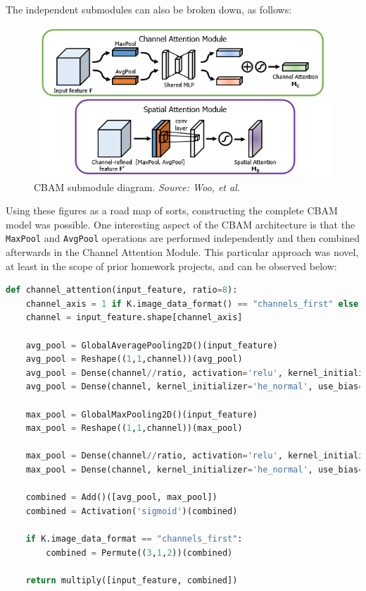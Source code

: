 \documentclass{article}
\begin{document}
The independent submodules can also be broken down, as follows:

\begin{figure}[H]
    \centering
    \includegraphics[width=5in]{csci-8920/hw-4/images/cbam-module-diagrams.png}
    \caption{CBAM submodule diagram. \textit{Source: Woo, et al.} \cite{Woo2018CBAM:Module}}
    \label{fig:cbam_mod_diag}
\end{figure}

Using these figures as a road map of sorts, constructing the complete CBAM model was possible.
One interesting aspect of the CBAM architecture is that the \lstinline{MaxPool} and \lstinline{AvgPool} operations are performed independently and then combined afterwards in the Channel Attention Module.
This particular approach was novel, at least in the scope of prior homework projects, and can be observed below:

\begin{lstlisting}[language=Python]
def channel_attention(input_feature, ratio=8):
    channel_axis = 1 if K.image_data_format() == "channels_first" else -1
    channel = input_feature.shape[channel_axis]

    avg_pool = GlobalAveragePooling2D()(input_feature)
    avg_pool = Reshape((1,1,channel))(avg_pool)
    avg_pool = Dense(channel//ratio, activation='relu', kernel_initializer='he_normal', use_bias=True, bias_initializer='zeros')(avg_pool)
    avg_pool = Dense(channel, kernel_initializer='he_normal', use_bias=True, bias_initializer='zeros')(avg_pool)

    max_pool = GlobalMaxPooling2D()(input_feature)
    max_pool = Reshape((1,1,channel))(max_pool)

    max_pool = Dense(channel//ratio, activation='relu', kernel_initializer='he_normal', use_bias=True, bias_initializer='zeros')(max_pool)
    max_pool = Dense(channel, kernel_initializer='he_normal', use_bias=True, bias_initializer='zeros')(max_pool)

    combined = Add()([avg_pool, max_pool])
    combined = Activation('sigmoid')(combined)

    if K.image_data_format == "channels_first":
        combined = Permute((3,1,2))(combined)

    return multiply([input_feature, combined]) 
\end{lstlisting}
\end{document}
